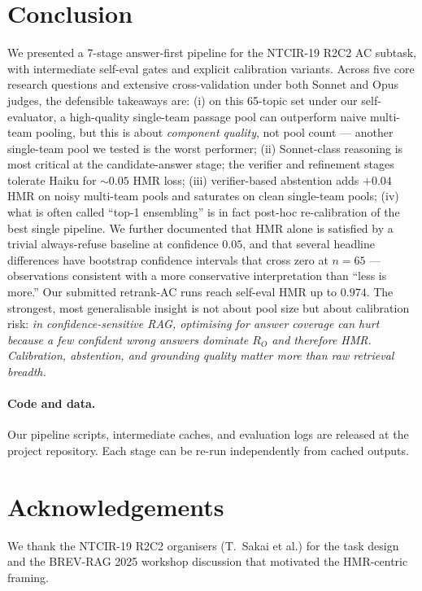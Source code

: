 \documentclass[11pt,a4paper]{article}
\newcommand{\HMR}{\textsc{HMR}}
\begin{document}
\section{Conclusion}

We presented a 7-stage answer-first pipeline for the NTCIR-19 R2C2
AC subtask, with intermediate self-eval gates and explicit
calibration variants. Across five core research questions and
extensive cross-validation under both Sonnet and Opus judges, the
defensible takeaways are: (i) on this 65-topic set under our
self-evaluator, a high-quality single-team passage pool can
outperform naive multi-team pooling, but this is about
\emph{component quality}, not pool count — another single-team
pool we tested is the worst performer; (ii) Sonnet-class reasoning
is most critical at the candidate-answer stage; the verifier and
refinement stages tolerate Haiku for $\sim 0.05$ HMR loss; (iii)
verifier-based abstention adds $+0.04$ HMR on noisy multi-team
pools and saturates on clean single-team pools; (iv) what is often
called ``top-1 ensembling'' is in fact post-hoc re-calibration of
the best single pipeline. We further documented that \HMR{} alone
is satisfied by a trivial always-refuse baseline at confidence
$0.05$, and that several headline differences have bootstrap
confidence intervals that cross zero at $n=65$ — observations
consistent with a more conservative interpretation than ``less is
more.'' Our submitted retrank-AC runs reach self-eval \HMR{} up to
$0.974$. The strongest, most generalisable insight is not about
pool size but about calibration risk: \emph{in confidence-sensitive
RAG, optimising for answer coverage can hurt because a few confident
wrong answers dominate $R_O$ and therefore HMR. Calibration,
abstention, and grounding quality matter more than raw retrieval
breadth.}

\paragraph{Code and data.}
Our pipeline scripts, intermediate caches, and evaluation logs are
released at the project repository. Each stage can be re-run
independently from cached outputs.

\section*{Acknowledgements}

We thank the NTCIR-19 R2C2 organisers (T.~Sakai et al.) for the task
design and the BREV-RAG 2025 workshop discussion that motivated the
HMR-centric framing.
\end{document}
